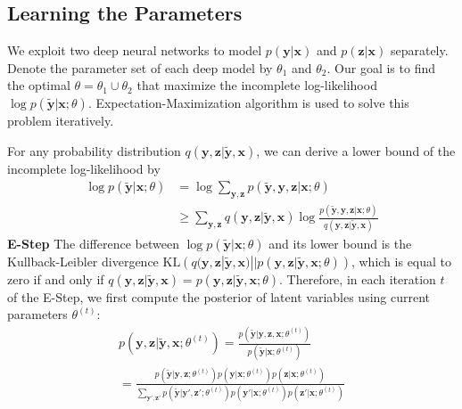 \documentclass[10pt,twocolumn,letterpaper]{article}
\def\vec{\mathbf}
\begin{document}
\subsection{Learning the Parameters} %
\label{sub:learning_the_parameters}
We exploit two deep neural networks to model $p(\vec{y} | \vec{x})$ and $p(\vec{z} | \vec{x})$ separately. Denote the parameter set of each deep model by $\theta_1$ and $\theta_2$. Our goal is to find the optimal $\theta = \theta_1 \cup \theta_2$ that maximize the incomplete log-likelihood $\log p(\tilde{\vec{y}} | \vec{x}; \theta)$. Expectation-Maximization algorithm is used to solve this problem iteratively.

For any probability distribution $q(\vec{y}, \vec{z} | \tilde{\vec{y}}, \vec{x})$, we can derive a lower bound of the incomplete log-likelihood by
\begin{equation}
\begin{aligned}
    \log p(\tilde{\vec{y}} | \vec{x}; \theta) &= \log \sum_{\vec{y},\vec{z}} p(\tilde{\vec{y}}, \vec{y}, \vec{z} | \vec{x}; \theta) \\
    &\geq \sum_{\vec{y},\vec{z}} q(\vec{y}, \vec{z} | \tilde{\vec{y}}, \vec{x}) \log \frac{p(\tilde{\vec{y}}, \vec{y}, \vec{z} | \vec{x}; \theta)}{q(\vec{y}, \vec{z} | \tilde{\vec{y}}, \vec{x})}
\end{aligned}
\end{equation}
\textbf{E-Step} The difference between $\log p(\tilde{\vec{y}} | \vec{x}; \theta)$ and its lower bound is the Kullback-Leibler divergence $\mathrm{KL}\left(q(\vec{y}, \vec{z} | \tilde{\vec{y}}, \vec{x}) || p(\vec{y}, \vec{z} | \tilde{\vec{y}}, \vec{x}; \theta)\right)$, which is equal to zero if and only if $q(\vec{y}, \vec{z} | \tilde{\vec{y}}, \vec{x}) = p(\vec{y}, \vec{z} | \tilde{\vec{y}}, \vec{x}; \theta)$. Therefore, in each iteration $t$ of the E-Step, we first compute the posterior of latent variables using current parameters $\theta^{(t)}$:
\begin{multline} \label{eq:posterior}
    p(\vec{y}, \vec{z} | \tilde{\vec{y}}, \vec{x}; \theta^{(t)}) = \frac{p(\tilde{\vec{y}} | \vec{y}, \vec{z}, \vec{x}; \theta^{(t)})}{p(\tilde{\vec{y}} | \vec{x}; \theta^{(t)})} \\
    = \frac{p(\tilde{\vec{y}}|\vec{y},\vec{z};\theta^{(t)}) p(\vec{y}|\vec{x};\theta^{(t)}) p(\vec{z}|\vec{x};\theta^{(t)})}{\sum_{\vec{y}',\vec{z}'} p(\tilde{\vec{y}}|\vec{y}',\vec{z}';\theta^{(t)}) p(\vec{y}'|\vec{x};\theta^{(t)}) p(\vec{z}'|\vec{x};\theta^{(t)})}
\end{multline}
\end{document}

